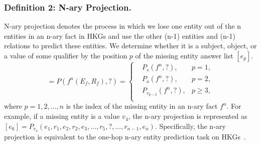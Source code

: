 \documentclass[letterpaper]{article} \usepackage{aaai23}  \usepackage{times}  \usepackage{helvet}  \usepackage{courier}  \usepackage[hyphens]{url}  \usepackage{graphicx} \urlstyle{rm} \def\UrlFont{\rm}  \usepackage{natbib}  \usepackage{caption} \frenchspacing  \setlength{\pdfpagewidth}{8.5in}  \setlength{\pdfpageheight}{11in}  \usepackage{algorithm}
\begin{document}
\subsubsection{Definition 2: N-ary Projection.}
N-ary projection denotes the process in which we lose one entity out of the n entities in an n-ary fact in HKGs and use the other (n-1) entities and (n-1) relations to predict these entities. We determine whether it is a subject, object, or a value of some qualifier by the position $p$ of the missing entity answer list $[e_p]$. 
\begin{equation}
[e_p]=P(f^n(E_f,R_f),?)=\left\{
\begin{aligned}
&P_s(f^n,?),&p=1,\\&P_o(f^n,?),&p=2,\\&P_{v_{p-2}}(f^n,?),&p\geq3,\\\end{aligned}
\right.
\end{equation}
where $p=1,2,\ldots,n$ is the index of the missing entity in an n-ary fact $f^n$. For example, if a missing entity is a value $v_4$, the n-ary projection is represented as $[e_{6}]=P_{v_4}(e_1,r_1,e_2,r_2,e_3,\ldots,r_5,?,\ldots,r_{n-1},e_n)$. Specifically, the n-ary projection is equivalent to the one-hop n-ary entity prediction task on HKGs~\citep{GRAN}.
\end{document}
